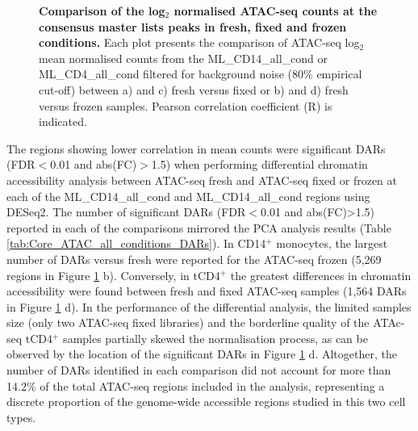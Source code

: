 \begin{figure}[H]
\begin{subfigure}[b]{0.45\textwidth}
\end{subfigure}
\caption[Comparison of the log$_2$ normalised ATAC-seq counts at the consensus master lists peaks in fresh, fixed and frozen conditions.]{\textbf{Comparison of the log$_2$ normalised ATAC-seq counts at the consensus master lists peaks in fresh, fixed and frozen conditions.} Each plot presents the comparison of ATAC-seq log$_2$ mean normalised counts from the ML\_CD14\_all\_cond or ML\_CD4\_all\_cond filtered for background noise (80\% empirical cut-off) between a) and c) fresh versus fixed or b) and d) fresh versus frozen samples. Pearson correlation coefficient (R) is indicated.}
\label{figure:Core_ATAC_all-conditions_correlation}
\end{figure}
	
	
The regions showing lower correlation in mean counts were significant DARs (FDR$<$0.01 and abs(FC)$>$1.5) when performing differential chromatin accessibility analysis between ATAC-seq fresh and ATAC-seq fixed or frozen at each of the ML\_CD14\_all\_cond and ML\_CD14\_all\_cond regions using DESeq2. The number of significant DARs (FDR$<$0.01 and abs(FC)>1.5) reported in each of the comparisons mirrored the PCA analysis results (Table \ref{tab:Core_ATAC_all_conditions_DARs}). In CD14$^+$ monocytes, the largest number of DARs versus fresh were reported for the ATAC-seq frozen (5,269 regions in Figure \ref{figure:Core_ATAC_all-conditions_correlation} b). Conversely, in tCD4$^+$ the greatest differences in chromatin accessibility were found between fresh and fixed ATAC-seq samples (1,564 DARs in Figure \ref{figure:Core_ATAC_all-conditions_correlation} d). In the performance of the differential analysis, the limited samples size (only two ATAC-seq fixed libraries) and the borderline quality of the ATAc-seq tCD4$^+$ samples partially skewed the normalisation process, as can be observed by the location of the significant DARs in Figure \ref{figure:Core_ATAC_all-conditions_correlation} d. Altogether, the number of DARs identified in each comparison did not account for more than 14.2\% of the total ATAC-seq regions included in the analysis, representing a discrete proportion of the genome-wide accessible regions studied in this two cell types.  


	

